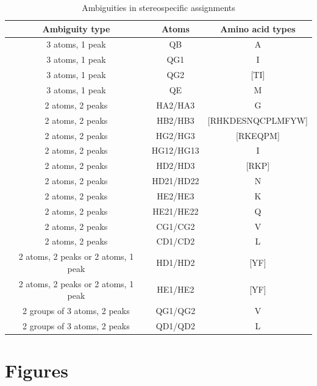 \begin{table}
  \begin{tabular}{ | c | c | c |}
    \hline
    Ambiguity type    &  Atoms        &  Amino acid types     \\  \hline 
    3 atoms, 1 peak   &  QB           &  A                    \\  \hline 
    3 atoms, 1 peak   &  QG1          &  I                    \\  \hline 
    3 atoms, 1 peak   &  QG2          &  [TI]                 \\  \hline 
    3 atoms, 1 peak   &  QE           &  M                    \\  \hline 
    2 atoms, 2 peaks  &  HA2/HA3      &  G                    \\  \hline 
    2 atoms, 2 peaks  &  HB2/HB3      &  [RHKDESNQCPLMFYW]    \\  \hline 
    2 atoms, 2 peaks  &  HG2/HG3      &  [RKEQPM]             \\  \hline 
    2 atoms, 2 peaks  &  HG12/HG13    &  I                    \\  \hline 
    2 atoms, 2 peaks  &  HD2/HD3      &  [RKP]                \\  \hline 
    2 atoms, 2 peaks  &  HD21/HD22    &  N                    \\  \hline 
    2 atoms, 2 peaks  &  HE2/HE3      &  K                    \\  \hline 
    2 atoms, 2 peaks  &  HE21/HE22    &  Q                    \\  \hline 
    2 atoms, 2 peaks  &  CG1/CG2      &  V                    \\  \hline 
    2 atoms, 2 peaks  &  CD1/CD2      &  L                    \\  \hline 
    2 atoms, 2 peaks or 2 atoms, 1 peak  &  HD1/HD2  &  [YF]  \\  \hline 
    2 atoms, 2 peaks or 2 atoms, 1 peak  &  HE1/HE2  &  [YF]  \\  \hline 
    2 groups of 3 atoms, 2 peaks  &  QG1/QG2  &  V            \\  \hline
    2 groups of 3 atoms, 2 peaks  &  QD1/QD2  &  L            \\  \hline
  \end{tabular}
  \caption{Ambiguities in stereospecific assignments}
  \label{stereospecific_ambiguities}
\end{table}


\clearpage
\section{Figures}

